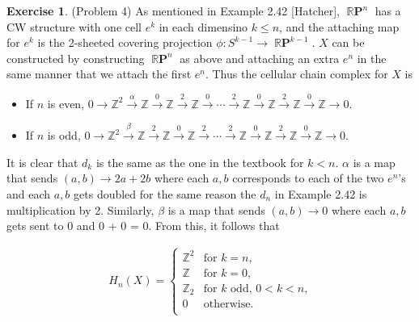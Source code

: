 \documentclass[12pt, psamsfonts]{amsart}
\theoremstyle{definition}
\newtheorem*{exer}{Exercise}
\theoremstyle{remark}
\DeclareMathOperator{\RP}{\mathbb{R}\mathbf{P}}
\numberwithin{equation}{section}
\begin{document}
\begin{exer}{(Problem 4)}
  As mentioned in Example 2.42 [Hatcher], $\RP^n$ has a CW structure with one cell $e^k$ in each dimensino $k \leq n$, and the attaching map for $e^k$ is the 2-sheeted covering projection $\phi: S^{k - 1} \rightarrow \RP^{k - 1}$.
  $X$ can be constructed by constructing $\RP^n$ as above and attaching an extra $e^n$ in the same manner that we attach the first $e^n$.
  Thus the cellular chain complex for $X$ is
  \begin{itemize}
    \item
      If $n$ is even, $0 \rightarrow \mathbb{Z}^2 \xrightarrow{\alpha} \mathbb{Z} \xrightarrow{0} \mathbb{Z} \xrightarrow{2} \mathbb{Z} \xrightarrow{0} \cdots \xrightarrow{2} \mathbb{Z} \xrightarrow{0} \mathbb{Z} \xrightarrow{2} \mathbb{Z} \xrightarrow{0} \mathbb{Z} \rightarrow 0$.
    \item
      If $n$ is odd, $0 \rightarrow \mathbb{Z}^2 \xrightarrow{\beta} \mathbb{Z} \xrightarrow{2} \mathbb{Z} \xrightarrow{0} \mathbb{Z} \xrightarrow{2} \cdots \xrightarrow{2} \mathbb{Z} \xrightarrow{0} \mathbb{Z} \xrightarrow{2} \mathbb{Z} \xrightarrow{0} \mathbb{Z} \rightarrow 0$.
  \end{itemize}
  It is clear that $d_k$ is the same as the one in the textbook for $k < n$.
  $\alpha$ is a map that sends $(a, b) \rightarrow 2a + 2b$ where each $a, b$ corresponds to each of the two $e^n$'s and each $a, b$ gets doubled for the same reason the $d_n$ in Example 2.42 is multiplication by 2.
  Similarly, $\beta$ is a map that sends $(a, b) \rightarrow 0$ where each $a, b$ gets sent to 0 and 0 + 0 = 0.
  From this, it follows that

  \begin{align*}
    H_{n}(X) = \begin{cases}
      \mathbb{Z}^2 & \text{for $k = n$,} \\
      \mathbb{Z} & \text{for $k = 0$,} \\
      \mathbb{Z}_2 & \text{for $k$ odd, $0 < k < n$,} \\
      0 & \text{otherwise.} \\
    \end{cases}
  \end{align*}
\end{exer}
\end{document}
